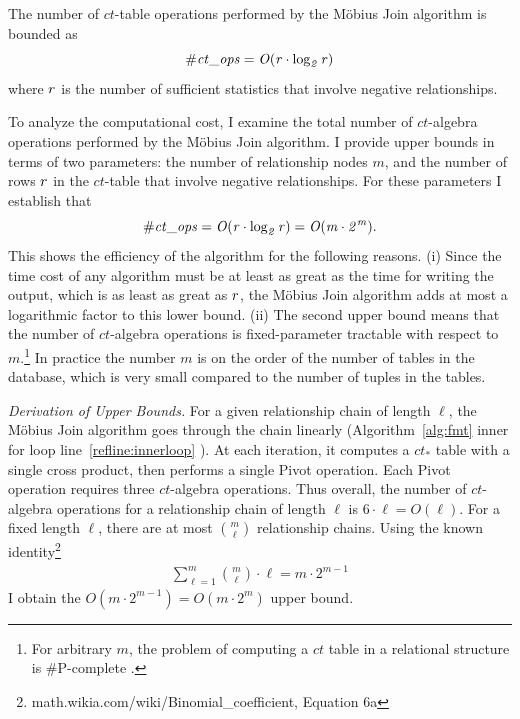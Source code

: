 \documentclass{sfuthesis}
\newcommand{\ct}{\mathit{ct}}
\begin{document}
\begin{proposition}
The number of $\ct$-table operations performed by the M\"obius Join algorithm is bounded as $$\it{\# \ct\_\it{ops}} = O(r \cdot \log_{2} r)$$ where $r$ is the number of sufficient statistics that involve negative relationships.
\end{proposition}



To  analyze the computational cost, I  examine the total number of $\ct$-algebra operations performed by the  M\"obius Join algorithm. 
%
I  provide  upper bounds in terms of two parameters: the number of relationship nodes  $m$, and  the number of rows $r$  in the $\ct$-table that involve negative relationships.
For these parameters I  establish that
$$\it{\# \ct\_\it{ops}} = O(r \cdot \log_{2} r) = O(m \cdot 2^{m}) .$$
This shows the efficiency of the algorithm for the following reasons.
(i) Since the time cost of any algorithm must be at least as great as the time for writing the output, which is as least as great as $r$, 
 the  M\"obius Join algorithm adds at most a logarithmic factor to this lower bound. 
(ii)  The second upper bound means that the number of $\ct$-algebra operations is fixed-parameter tractable with respect to $m$.\footnote{For arbitrary $m$, the problem of computing a $\ct$ table in a relational structure is \#P-complete \cite[Prop.12.4]{Domingos2007}.} In practice the number $m$ is on the order of the number of tables in the database, 
which is very small compared to the number of tuples in the tables.

\emph{Derivation of Upper Bounds.}
For a given relationship chain of length $\ell$,  the  M\"obius Join algorithm goes through the chain linearly (Algorithm~\ref{alg:fmt} 
inner for loop line~\ref{reﬂine:innerloop}%
). 
At each iteration, it computes a $\ct_{*}$ table with a single cross product, then performs a single Pivot operation.  Each Pivot operation requires three  $\ct$-algebra operations. Thus overall, the number of  $\ct$-algebra operations for a relationship chain of length $\ell$ is $6 \cdot \ell = O(\ell)$. For a fixed length $\ell$, there are at most $\binom{m}{\ell}$ relationship chains. Using the known identity\footnote{math.wikia.com/wiki/Binomial\_coefficient, Equation 6a}
\begin{align} 
\sum_{\ell=1}^{m} {m\choose \ell} \cdot \ell = m \cdot  2^{m-1} \label{eq:upperbound}
\end{align}
I  obtain the $O(m \cdot  2^{m-1}) = O(m \cdot  2^{m})$ upper bound.%
\end{document}
